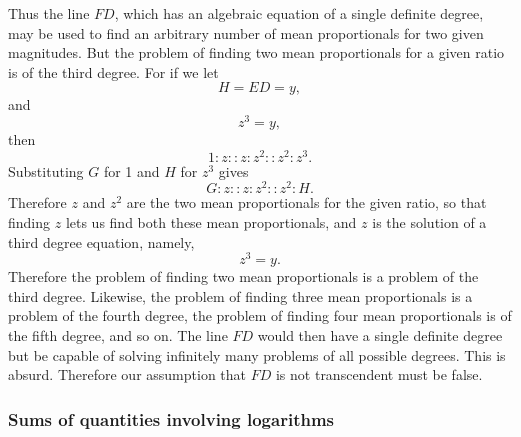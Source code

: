 \documentclass[polutonikogreek,english,twoside,openright]{article}
\begin{document}
 
\label{begmprop} Thus the line $FD$, which has an algebraic equation of a single definite degree, may be used to find an arbitrary number of mean proportionals for two given magnitudes.   But the problem of
finding two mean proportionals for a given ratio is of the third degree. For if we let
$$H = ED =y,$$
and
$$z^3 =y,$$
then
$$1\!:\! z :: z \!:\! z^2 :: z^2 \!:\! z^3.$$
Substituting $G$ for 1 and $H$ for $z^3$ gives
$$G\!:\! z :: z \!:\! z^2 :: z^2 \!:\! H.$$
Therefore $z$ and $z^2$ are the two mean proportionals for the given ratio, so that finding $z$ lets us find both these mean proportionals,  and $z$ is the solution of a third degree equation, namely,
$$z^3 = y.$$
Therefore the problem of finding two mean proportionals is a problem of the third degree.
Likewise, the problem of finding three mean proportionals is a problem of the fourth degree, the problem of finding four mean proportionals is of the fifth degree, and so on.  The line $FD$ would then have a single definite degree but be capable of solving infinitely many problems of all possible degrees.  This is absurd.  Therefore our assumption that $FD$ is not transcendent must be false.
\label{endmprop}
\label{elogtp}


\subsubsection*{Sums of quantities involving logarithms}

\setcounter{equation}{0}
\end{document}

